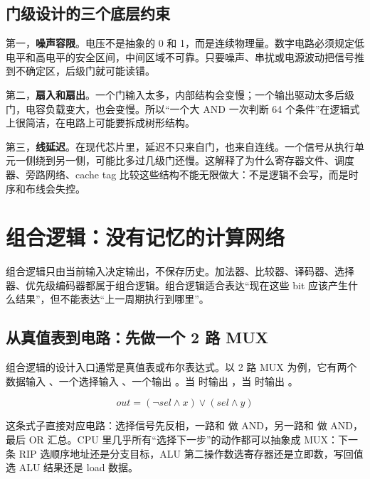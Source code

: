 \subsection{门级设计的三个底层约束}

第一，\textbf{噪声容限}。电压不是抽象的 0 和 1，而是连续物理量。数字电路必须规定低电平和高电平的安全区间，中间区域不可靠。只要噪声、串扰或电源波动把信号推到不确定区，后级门就可能读错。

第二，\textbf{扇入和扇出}。一个门输入太多，内部结构会变慢；一个输出驱动太多后级门，电容负载变大，也会变慢。所以“一个大 AND 一次判断 64 个条件”在逻辑式上很简洁，在电路上可能要拆成树形结构。

第三，\textbf{线延迟}。在现代芯片里，延迟不只来自门，也来自连线。一个信号从执行单元一侧绕到另一侧，可能比多过几级门还慢。这解释了为什么寄存器文件、调度器、旁路网络、cache tag 比较这些结构不能无限做大：不是逻辑不会写，而是时序和布线会失控。

\section{组合逻辑：没有记忆的计算网络}

组合逻辑只由当前输入决定输出，不保存历史。加法器、比较器、译码器、选择器、优先级编码器都属于组合逻辑。组合逻辑适合表达“现在这些 bit 应该产生什么结果”，但不能表达“上一周期执行到哪里”。

\subsection{从真值表到电路：先做一个 2 路 MUX}

组合逻辑的设计入口通常是真值表或布尔表达式。以 2 路 MUX 为例，它有两个数据输入 、一个选择输入 、一个输出 。当  时输出 ，当  时输出 。

\[
out = (\lnot sel \land x) \lor (sel \land y)
\]

这条式子直接对应电路：选择信号先反相，一路和  做 AND，另一路和  做 AND，最后 OR 汇总。CPU 里几乎所有“选择下一步”的动作都可以抽象成 MUX：下一条 RIP 选顺序地址还是分支目标，ALU 第二操作数选寄存器还是立即数，写回值选 ALU 结果还是 load 数据。

